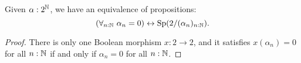\begin{lemma}\label{ClosedPropAsSpectrum}
  Given $\alpha:2^{\mathbb{N}}$, we have an equivalence of propositions: 
 \[ 
    (\forall_{n:\mathbb{N}}\ \alpha_n = 0 )\leftrightarrow \operatorname{Sp}(2/(\alpha_n)_{n:\mathbb{N}}).
  \] 
\end{lemma}
\begin{proof}
  There is only one Boolean morphism $x:2\to 2$, and it satisfies 
  $x(\alpha_n) = 0$ for all $n:\mathbb{N}$ if and only if
  $\alpha_n = 0$ for all $n:\mathbb{N}$. 
\end{proof}





